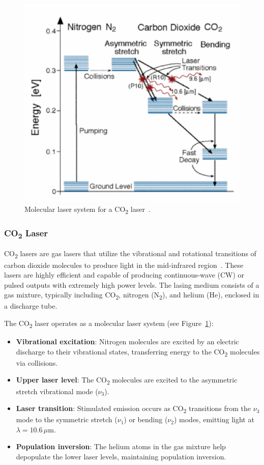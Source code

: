 \documentclass[prl,twocolumn]{revtex4-1}
\begin{document}
\begin{figure}
    \centering
    \includegraphics[width=\linewidth]{Images/CO2.png}
    \caption{Molecular laser system for a CO\textsubscript{2} laser~\cite{co2_lasers}.}
    \label{fig:CO2}
\end{figure}

\subsubsection{\textbf{CO\textsubscript{2} Laser}}
CO\textsubscript{2} lasers are gas lasers that utilize the vibrational and rotational transitions of carbon dioxide molecules to produce light in the mid-infrared region~\cite{co2_lasers}. These lasers are highly efficient and capable of producing continuous-wave (CW) or pulsed outputs with extremely high power levels. The lasing medium consists of a gas mixture, typically including CO\textsubscript{2}, nitrogen (N\textsubscript{2}), and helium (He), enclosed in a discharge tube.

The CO\textsubscript{2} laser operates as a molecular laser system (see Figure~\ref{fig:CO2}):
\begin{itemize}
  \item \textbf{Vibrational excitation}: Nitrogen molecules are excited by an electric discharge to their vibrational states, transferring energy to the CO\textsubscript{2} molecules via collisions.
  \item \textbf{Upper laser level}: The CO\textsubscript{2} molecules are excited to the asymmetric stretch vibrational mode (\( \nu_3 \)).
  \item \textbf{Laser transition}: Stimulated emission occurs as CO\textsubscript{2} transitions from the \( \nu_3 \) mode to the symmetric stretch (\( \nu_1 \)) or bending (\( \nu_2 \)) modes, emitting light at \( \lambda = 10.6 \, \mu\text{m} \).
  \item \textbf{Population inversion}: The helium atoms in the gas mixture help depopulate the lower laser levels, maintaining population inversion.
\end{itemize}
\end{document}

